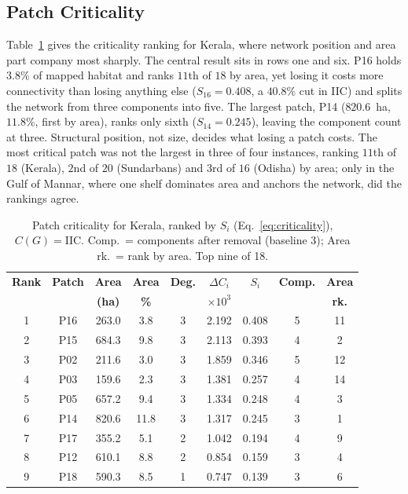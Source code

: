 \documentclass[conference]{IEEEtran}
\begin{document}
\subsection{Patch Criticality}

Table~\ref{tab:sensresults} gives the criticality ranking for Kerala, where network position and area part company most sharply. The central result sits in rows one and six. P16 holds $3.8\%$ of mapped habitat and ranks $11$th of $18$ by area, yet losing it costs more connectivity than losing anything else ($S_{16} = 0.408$, a $40.8\%$ cut in IIC) and splits the network from three components into five. The largest patch, P14 ($820.6$~ha, $11.8\%$, first by area), ranks only sixth ($S_{14} = 0.245$), leaving the component count at three. Structural position, not size, decides what losing a patch costs. The most critical patch was not the largest in three of four instances, ranking $11$th of $18$ (Kerala), $2$nd of $20$ (Sundarbans) and $3$rd of $16$ (Odisha) by area; only in the Gulf of Mannar, where one shelf dominates area and anchors the network, did the rankings agree.

\begin{table}[!tbp]
\centering
\caption{Patch criticality for Kerala, ranked by $S_i$ (Eq.~\eqref{eq:criticality}), $C(G) = \mathrm{IIC}$. Comp.\ = components after removal (baseline 3); Area rk.\ = rank by area. Top nine of 18.}
\label{tab:sensresults}
\scriptsize
\setlength{\tabcolsep}{3pt}
\renewcommand{\arraystretch}{0.95}
\begin{tabular}{@{}ccccccccc@{}}
\toprule
\textbf{Rank} & \textbf{Patch} & \textbf{Area} & \textbf{Area} & \textbf{Deg.} & $\Delta C_i$ & $S_i$ & \textbf{Comp.} & \textbf{Area} \\
 & & \textbf{(ha)} & \textbf{\%} & & $\times 10^{3}$ & & & \textbf{rk.} \\
\midrule
1 & P16 & 263.0 & 3.8  & 3 & 2.192 & 0.408 & 5 & 11 \\
2 & P15 & 684.3 & 9.8  & 3 & 2.113 & 0.393 & 4 & 2 \\
3 & P02 & 211.6 & 3.0  & 3 & 1.859 & 0.346 & 5 & 12 \\
4 & P03 & 159.6 & 2.3  & 3 & 1.381 & 0.257 & 4 & 14 \\
5 & P05 & 657.2 & 9.4  & 3 & 1.334 & 0.248 & 4 & 3 \\
6 & P14 & 820.6 & 11.8 & 3 & 1.317 & 0.245 & 3 & 1 \\
7 & P17 & 355.2 & 5.1  & 2 & 1.042 & 0.194 & 4 & 9 \\
8 & P12 & 610.1 & 8.8  & 2 & 0.854 & 0.159 & 3 & 4 \\
9 & P18 & 590.3 & 8.5  & 1 & 0.747 & 0.139 & 3 & 6 \\
\bottomrule
\end{tabular}
\end{table}
\end{document}
